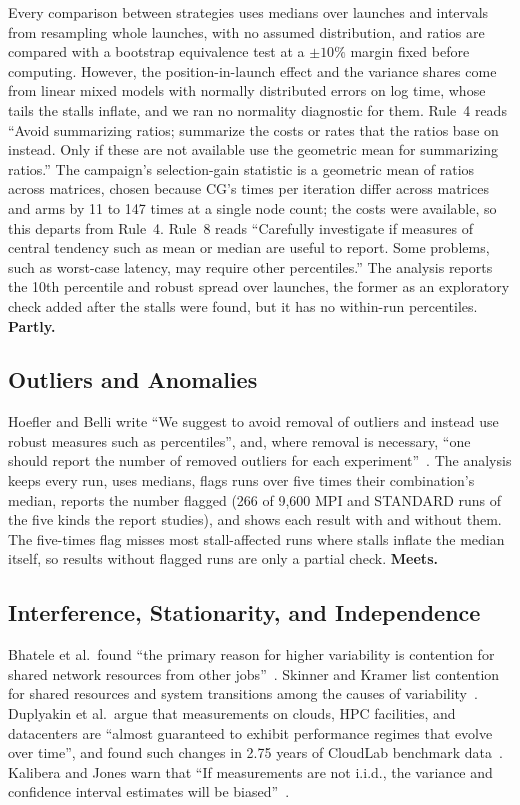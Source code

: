 \documentclass[11pt]{article}
\newcommand{\verdict}[1]{\textbf{#1}}
\begin{document}
Every comparison between strategies uses medians over launches and intervals from
resampling whole launches, with no assumed distribution, and ratios are compared with a
bootstrap equivalence test at a $\pm10\%$ margin fixed before computing. However, the
position-in-launch effect and the variance shares come from linear mixed models with
normally distributed errors on log time, whose tails the stalls inflate, and we ran no
normality diagnostic for them. Rule~4 reads ``Avoid summarizing ratios; summarize the
costs or rates that the ratios base on instead. Only if these are not available use the
geometric mean for summarizing ratios.'' The campaign's selection-gain statistic is a
geometric mean of ratios across matrices, chosen because CG's times per iteration
differ across matrices and arms by 11 to 147 times at a single node count; the costs
were available, so this departs from Rule~4. Rule~8
reads ``Carefully investigate if measures of central tendency such as mean or median are
useful to report. Some problems, such as worst-case latency, may require other
percentiles.'' The analysis reports the 10th percentile and robust spread over launches,
the former as an exploratory check added after the stalls were found, but it has no
within-run percentiles. \verdict{Partly.}

\subsection{Outliers and Anomalies}

Hoefler and Belli write ``We suggest to avoid removal of outliers and instead use robust
measures such as percentiles'', and, where removal is necessary, ``one should report the
number of removed outliers for each experiment''~\cite{hoefler2015scientific}. The
analysis keeps every run, uses medians, flags runs over five times their combination's
median, reports the number flagged (266 of 9,600 MPI and STANDARD runs of the five kinds
the report studies), and shows each result with and without them. The five-times flag
misses most stall-affected runs where stalls inflate the median itself, so results
without flagged runs are only a partial check. \verdict{Meets.}

\subsection{Interference, Stationarity, and Independence}

Bhatele et al.\ found ``the primary reason for higher variability is contention for
shared network resources from other jobs''~\cite{bhatele2013there}. Skinner and Kramer
list contention for shared resources and system transitions among the causes of
variability~\cite{skinner2005understanding}. Duplyakin et al.\ argue that measurements on
clouds, HPC facilities, and datacenters are ``almost guaranteed to exhibit performance
regimes that evolve over time'', and found such changes in 2.75 years of CloudLab
benchmark data~\cite{duplyakin2020datacenter}. Kalibera and Jones warn that ``If
measurements are not i.i.d., the variance and confidence interval estimates will be
biased''~\cite{kalibera2013rigorous}.
\end{document}
